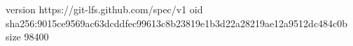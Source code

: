 version https://git-lfs.github.com/spec/v1
oid sha256:9015ce9569ac63dcddfec99613c8b23819e1b3d22a28219ae12a9512dc484c0b
size 98400
